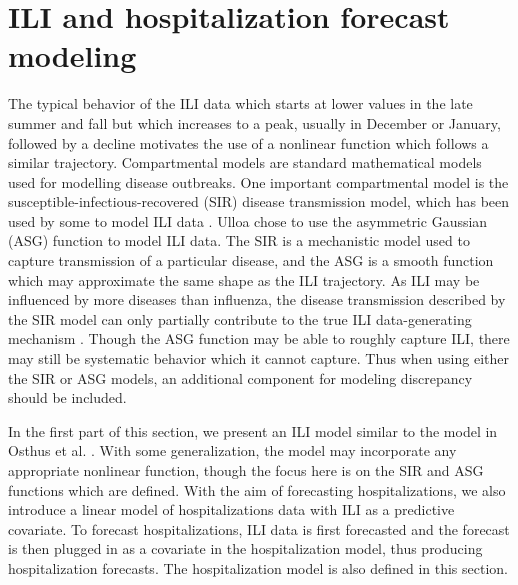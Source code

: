 \section{ILI and hospitalization forecast modeling} \label{sec:functions}


The typical behavior of the ILI data which starts at lower values in the late 
summer and fall but which increases to a peak, usually in December or January, 
followed by a decline motivates the use of a nonlinear function which follows 
a similar trajectory. Compartmental models are standard mathematical models 
used for modelling disease outbreaks. One important compartmental model is the 
susceptible-infectious-recovered (SIR) 
disease transmission model, which has been used by some to model 
ILI data \cite[]{osthus2019dynamic, allen2017primer}. Ulloa \cite[]{ulloa2019} 
chose to use the asymmetric Gaussian (ASG) function to model ILI data. 
The SIR is a mechanistic model used to capture transmission of a particular
disease, and the ASG is a smooth function which may approximate the 
same shape as the ILI trajectory. As ILI may be influenced by more 
diseases than influenza, the disease transmission described by the SIR model
can only partially contribute to the true ILI data-generating mechanism
\cite[]{osthus2019dynamic}.
Though the ASG function may be able to roughly capture ILI, there may still be 
systematic behavior which it cannot capture. Thus when using either the SIR
or ASG models, an additional component for modeling discrepancy should be 
included.

In the first part of this section, we present an ILI model 
similar to the model in Osthus et al. \cite[]{osthus2019dynamic}. With some 
generalization, the model may incorporate any appropriate nonlinear function, 
though the focus here is on the SIR and ASG functions which are defined. 
With the aim of forecasting hospitalizations, we also introduce a linear 
model of hospitalizations data with ILI as a predictive covariate. To forecast 
hospitalizations, ILI data is first forecasted and the forecast is then 
plugged in as a covariate in the hospitalization model, thus producing 
hospitalization forecasts. The hospitalization model is also defined in this 
section.

